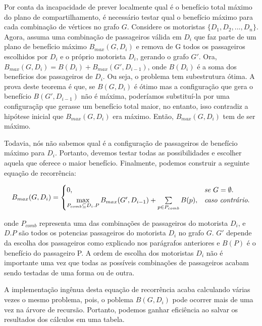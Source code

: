 \documentclass{article}
\begin{document}
Por conta da incapacidade de prever localmente qual é o benefício total máximo do plano de compartilhamento, é necessário testar 
qual o benefício máximo para cada combinação de vértices no grafo $ G $. Considere os motoristas $ \{ D_1, D_2, ..., D_n \} $.
Agora, assuma uma combinação de passageiros válida em $ D_i $ que faz parte de um plano de benefício máximo $ B_{max}(G, D_i) $ 
e remova de G todos os passageiros escolhidos por $ D_i $ e o próprio motorista $ D_i $, gerando o grafo $ G' $. Ora,
$ B_{max}(G, D_{i}) = B(D_i) + B_{max}(G', D_{i - 1}) $, onde $ B(D_i) $ é a soma dos benefícios dos passageiros de $ D_i $.
Ou seja, o problema tem subestrutura ótima. A prova deste teorema é que, se $ B(G, D_{i}) $ é ótimo mas a configuração que gera
o benefício $ B(G', D_{i - 1}) $ não é máxima, poderíamos substituí-la por uma configuraçãp que gerasse um benefício total
maior, no entanto, isso contradiz a hipótese inicial que $ B_{max}(G, D_{i}) $ era máximo. Então, $ B_{max}(G, D_{i}) $ tem de ser
máximo.

Todavia, nós não sabemos qual é a configuração de passageiros de benefício máximo para $ D_i $. Portanto, devemos testar
todas as possibilidades e escolher aquela que oferece o maior benefício. Finalmente, podemos construir a seguinte equação 
de recorrência:

\begin{equation}
  B_{max}(G, D_i) = 
  \begin{cases}
    0, & \textit{se $ G = \emptyset $}.\\
    \max\limits_{P_{comb} \subseteq D_i.P} B_{max}(G', D_{i-1}) + \sum\limits_{p \in P_{comb}} B(p), & \textit{caso contrário}.\\
  \end{cases}
\end{equation}

onde $ P_{comb} $ representa uma das combinações de passageiros do motorista $ D_i $, e $ D.P $ são todos os potencias passageiros do
motorista $ D_i $ no grafo $ G $. $ G' $ depende da escolha dos passageiros como explicado nos parágrafos anteriores e $ B(P) $ é o benefício do passageiro P.
A ordem de escolha dos motoristas $ D_i $ não é importante uma vez que todas as possíveis combinações de
passageiros acabam sendo testadas de uma forma ou de outra. 

A implementação ingênua desta equação de recorrência acaba calculando várias vezes o mesmo problema, pois, o poblema $ B(G, D_i) $ 
pode ocorrer mais de uma vez na árvore de recursão. Portanto, podemos ganhar eficiência ao
salvar os resultados dos cálculos em uma tabela.
\end{document}
